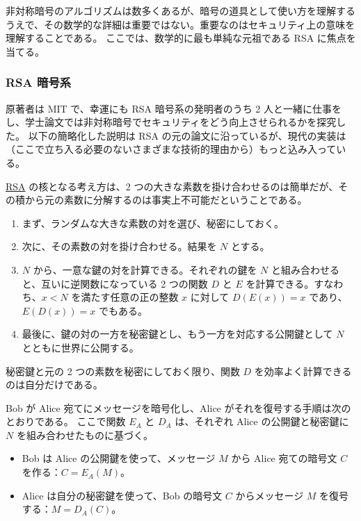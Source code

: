 \documentclass[uplatex]{jsarticle}
\def\label#1{}%
\begin{document}
非対称暗号のアルゴリズムは数多くあるが、暗号の道具として使い方を理解するうえで、その数学的な詳細は重要ではない。重要なのはセキュリティ上の意味を理解することである。
ここでは、数学的に最も単純な元祖である RSA に焦点を当てる。

\subsubsection{RSA 暗号系}

原著者は MIT で、幸運にも RSA 暗号系の発明者のうち 2 人と一緒に仕事をし、学士論文では非対称暗号でセキュリティをどう向上させられるかを探究した。
以下の簡略化した説明は RSA の元の論文に沿っているが、現代の実装は（ここで立ち入る必要のないさまざまな技術的理由から）もっと込み入っている。

\begin{dfn}\label{dfn:ch5-rsa}
\underline{RSA} の核となる考え方は、2 つの大きな素数を掛け合わせるのは簡単だが、その積から元の素数に分解するのは事実上不可能だということである。
\begin{enumerate}
\item まず、ランダムな大きな素数の対を選び、秘密にしておく。
\item 次に、その素数の対を掛け合わせる。結果を $N$ とする。
\item $N$ から、一意な鍵の対を計算できる。それぞれの鍵を $N$ と組み合わせると、互いに逆関数になっている 2 つの関数 $D$ と $E$ を計算できる。すなわち、$x<N$ を満たす任意の正の整数 $x$ に対して $D(E(x))=x$ であり、$E(D(x))=x$ でもある。
\item 最後に、鍵の対の一方を秘密鍵とし、もう一方を対応する公開鍵として $N$ とともに世界に公開する。
\end{enumerate}
秘密鍵と元の 2 つの素数を秘密にしておく限り、関数 $D$ を効率よく計算できるのは自分だけである。
\end{dfn}

\begin{exa}\label{exa:ch5-rsa-encrypt}
Bob が Alice 宛てにメッセージを暗号化し、Alice がそれを復号する手順は次のとおりである。
ここで関数 $E_A$ と $D_A$ は、それぞれ Alice の公開鍵と秘密鍵に $N$ を組み合わせたものに基づく。
\begin{itemize}
\item Bob は Alice の公開鍵を使って、メッセージ $M$ から Alice 宛ての暗号文 $C$ を作る：$C = E_A(M)$。
\item Alice は自分の秘密鍵を使って、Bob の暗号文 $C$ からメッセージ $M$ を復号する：$M = D_A(C)$。
\end{itemize}
\end{exa}
\end{document}
